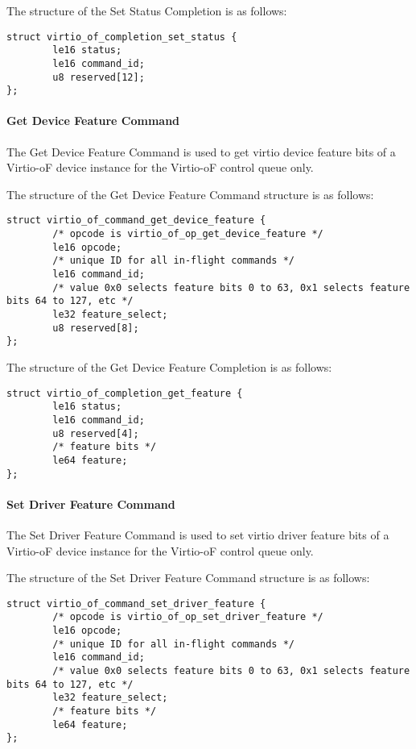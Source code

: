 The structure of the Set Status Completion is as follows:
\begin{lstlisting}
struct virtio_of_completion_set_status {
        le16 status;
        le16 command_id;
        u8 reserved[12];
};
\end{lstlisting}

\paragraph{Get Device Feature Command}\label{sec:Virtio Transport Options / Virtio Over Fabrics / Commands Definition / Opcodes / Get Device Feature Command}
The Get Device Feature Command is used to get virtio device feature bits of a Virtio-oF device instance for the Virtio-oF control queue only.

The structure of the Get Device Feature Command structure is as follows:
\begin{lstlisting}
struct virtio_of_command_get_device_feature {
        /* opcode is virtio_of_op_get_device_feature */
        le16 opcode;
        /* unique ID for all in-flight commands */
        le16 command_id;
        /* value 0x0 selects feature bits 0 to 63, 0x1 selects feature bits 64 to 127, etc */
        le32 feature_select;
        u8 reserved[8];
};
\end{lstlisting}

The structure of the Get Device Feature Completion is as follows:
\begin{lstlisting}
struct virtio_of_completion_get_feature {
        le16 status;
        le16 command_id;
        u8 reserved[4];
        /* feature bits */
        le64 feature;
};
\end{lstlisting}

\paragraph{Set Driver Feature Command}\label{sec:Virtio Transport Options / Virtio Over Fabrics / Commands Definition / Opcodes / Set Driver Feature Command}
The Set Driver Feature Command is used to set virtio driver feature bits of a Virtio-oF device instance for the Virtio-oF control queue only.

The structure of the Set Driver Feature Command structure is as follows:
\begin{lstlisting}
struct virtio_of_command_set_driver_feature {
        /* opcode is virtio_of_op_set_driver_feature */
        le16 opcode;
        /* unique ID for all in-flight commands */
        le16 command_id;
        /* value 0x0 selects feature bits 0 to 63, 0x1 selects feature bits 64 to 127, etc */
        le32 feature_select;
        /* feature bits */
        le64 feature;
};
\end{lstlisting}

